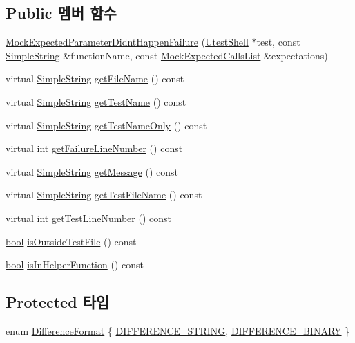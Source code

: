 \subsection*{Public 멤버 함수}
\begin{DoxyCompactItemize}
\item 
\hyperlink{class_mock_expected_parameter_didnt_happen_failure_ab9eda002a01c124f147d29b7b0dea827}{Mock\+Expected\+Parameter\+Didnt\+Happen\+Failure} (\hyperlink{class_utest_shell}{Utest\+Shell} $\ast$test, const \hyperlink{class_simple_string}{Simple\+String} \&function\+Name, const \hyperlink{class_mock_expected_calls_list}{Mock\+Expected\+Calls\+List} \&expectations)
\item 
virtual \hyperlink{class_simple_string}{Simple\+String} \hyperlink{class_test_failure_ac74fa65c497d9a175304a14ffafcaa1a}{get\+File\+Name} () const 
\item 
virtual \hyperlink{class_simple_string}{Simple\+String} \hyperlink{class_test_failure_a02da3865d8c38e5fd122a08a5e23773e}{get\+Test\+Name} () const 
\item 
virtual \hyperlink{class_simple_string}{Simple\+String} \hyperlink{class_test_failure_ac5e7fcbcf3831504c42ee41691b0a7e7}{get\+Test\+Name\+Only} () const 
\item 
virtual int \hyperlink{class_test_failure_a9d41f8ad9667ed1f471676d49a655ec7}{get\+Failure\+Line\+Number} () const 
\item 
virtual \hyperlink{class_simple_string}{Simple\+String} \hyperlink{class_test_failure_a55ca73e984d01e477b9cc990acf7dffd}{get\+Message} () const 
\item 
virtual \hyperlink{class_simple_string}{Simple\+String} \hyperlink{class_test_failure_a2fb8d164bb0730492e0140ec8080f13f}{get\+Test\+File\+Name} () const 
\item 
virtual int \hyperlink{class_test_failure_a9fd9b831dfada83bbc2a1847918080a6}{get\+Test\+Line\+Number} () const 
\item 
\hyperlink{avb__gptp_8h_af6a258d8f3ee5206d682d799316314b1}{bool} \hyperlink{class_test_failure_a977b24b749f7dc0d279fed902991c7b4}{is\+Outside\+Test\+File} () const 
\item 
\hyperlink{avb__gptp_8h_af6a258d8f3ee5206d682d799316314b1}{bool} \hyperlink{class_test_failure_a8658daf09d68f724672ed9c7b1d94e95}{is\+In\+Helper\+Function} () const 
\end{DoxyCompactItemize}
\subsection*{Protected 타입}
\begin{DoxyCompactItemize}
\item 
enum \hyperlink{class_test_failure_aaadecd271c82449768993cbf919de0a2}{Difference\+Format} \{ \hyperlink{class_test_failure_aaadecd271c82449768993cbf919de0a2a1246a1a469970104212c9113e3f057c9}{D\+I\+F\+F\+E\+R\+E\+N\+C\+E\+\_\+\+S\+T\+R\+I\+NG}, 
\hyperlink{class_test_failure_aaadecd271c82449768993cbf919de0a2af76cc43dfdf0618b3cb16196894d5929}{D\+I\+F\+F\+E\+R\+E\+N\+C\+E\+\_\+\+B\+I\+N\+A\+RY}
 \}
\end{DoxyCompactItemize}
